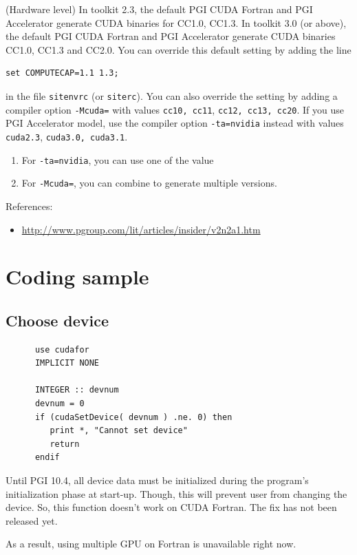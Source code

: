(Hardware level) In toolkit 2.3, the default PGI CUDA Fortran and PGI
Accelerator generate CUDA binaries for CC1.0, CC1.3. In toolkit 3.0
(or above), the default PGI CUDA Fortran and PGI Accelerator generate
CUDA binaries CC1.0, CC1.3 and CC2.0. You can override this default
setting by adding the line
\begin{verbatim}
set COMPUTECAP=1.1 1.3;
\end{verbatim}
in the file \verb!sitenvrc! (or \verb!siterc!). You can also override
the setting by adding a compiler option \verb!-Mcuda=! with values
\verb!cc10, cc11!, \verb!cc12, cc13, cc20!. If you use PGI Accelerator
model, use the compiler option \verb!-ta=nvidia! instead with values
\verb!cuda2.3!, \verb!cuda3.0, cuda3.1!.
\begin{enumerate}
\item For \verb!-ta=nvidia!, you can use one of the value
\item For \verb!-Mcuda=!, you can combine to generate multiple
  versions. 
\end{enumerate}


References:
\begin{itemize}
\item \url{http://www.pgroup.com/lit/articles/insider/v2n2a1.htm}
\end{itemize}

\section{Coding sample}
\label{sec:coding-sample}

\subsection{Choose device}
\label{sec:choose-device}


\begin{lstlisting}
      use cudafor
      IMPLICIT NONE

      INTEGER :: devnum
      devnum = 0
      if (cudaSetDevice( devnum ) .ne. 0) then
         print *, "Cannot set device"
         return
      endif
\end{lstlisting}
Until PGI 10.4, all device data must be initialized during the
program's initialization phase at start-up. Though, this will prevent
user from changing the device. So, this function doesn't work on
CUDA Fortran. The fix has not been released yet.

As a result, using multiple GPU on Fortran is unavailable right now. 

